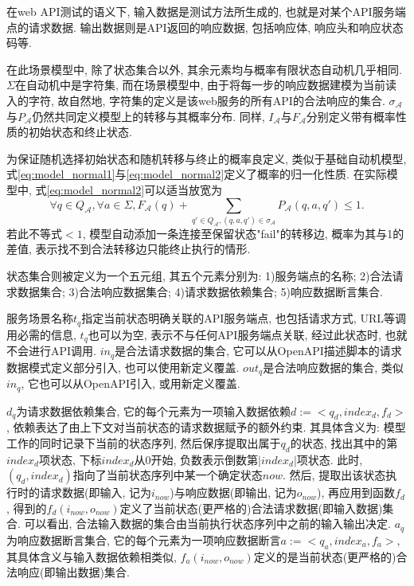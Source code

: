         在web API测试的语义下, 输入数据是测试方法所生成的, 也就是对某个API服务端点的请求数据. 输出数据则是API返回的响应数据, 包括响应体, 响应头和响应状态码等.
        
        在此场景模型中, 除了状态集合以外, 其余元素均与概率有限状态自动机几乎相同. $\Sigma$在自动机中是字符集, 而在场景模型中, 由于将每一步的响应数据建模为当前读入的字符, 故自然地, 字符集的定义是该web服务的所有API的合法响应的集合. $\sigma_{\mathcal{A}}$与$P_{\mathcal{A}}$仍然共同定义模型上的转移与其概率分布. 同样, $I_{\mathcal{A}}$与$F_{\mathcal{A}}$分别定义带有概率性质的初始状态和终止状态.
        
        为保证随机选择初始状态和随机转移与终止的概率良定义, 类似于基础自动机模型, 式\ref{eq:model_normal1}与\ref{eq:model_normal2}定义了概率的归一化性质. 在实际模型中, 式\ref{eq:model_normal2}可以适当放宽为
        \begin{equation}
            \label{eq:model_normal2_relax}
            \forall q \in Q_{\mathcal{A}}, \forall a \in \Sigma, F_{\mathcal{A}}(q) + \sum_{q' \in Q_{\mathcal{A}}, (q,a,q') \in \sigma_{\mathcal{A}}} P_{\mathcal{A}}(q,a,q') \leq 1.
        \end{equation}
        若此不等式$< 1$, 模型自动添加一条连接至保留状态"fail"的转移边, 概率为其与1的差值, 表示找不到合法转移边只能终止执行的情形.
        
        状态集合则被定义为一个五元组, 其五个元素分别为: 1)服务端点的名称; 2)合法请求数据集合; 3)合法响应数据集合; 4)请求数据依赖集合; 5)响应数据断言集合.
        
        服务场景名称$t_q$指定当前状态明确关联的API服务端点, 也包括请求方式, URL等调用必需的信息, $t_q$也可以为空, 表示不与任何API服务端点关联, 经过此状态时, 也就不会进行API调用. $in_q$是合法请求数据的集合, 它可以从OpenAPI描述脚本的请求数据模式定义部分引入, 也可以使用新定义覆盖. $out_q$是合法响应数据的集合, 类似$in_q$, 它也可以从OpenAPI引入, 或用新定义覆盖.
        
        $d_q$为请求数据依赖集合, 它的每个元素为一项输入数据依赖$d := <q_d, index_d, f_d >$, 依赖表达了由上下文对当前状态的请求数据赋予的额外约束. 其具体含义为: 模型工作的同时记录下当前的状态序列, 然后保序提取出属于$q_d$的状态, 找出其中的第$index_d$项状态, 下标$index_d$从0开始, 负数表示倒数第$|index_d|$项状态. 此时, $(q_d, index_d)$指向了当前状态序列中某一个确定状态$now$. 然后, 提取出该状态执行时的请求数据(即输入, 记为$i_{now}$)与响应数据(即输出, 记为$o_{now}$), 再应用到函数$f_d$, 得到的$f_d(i_{now}, o_{now})$定义了当前状态(更严格的)合法请求数据(即输入数据)集合. 可以看出, 合法输入数据的集合由当前执行状态序列中之前的输入输出决定. $a_q$为响应数据断言集合, 它的每个元素为一项响应数据断言$a := <q_a, index_a, f_a>$, 其具体含义与输入数据依赖相类似, $f_a(i_{now}, o_{now})$定义的是当前状态(更严格的)合法响应(即输出数据)集合.
        
